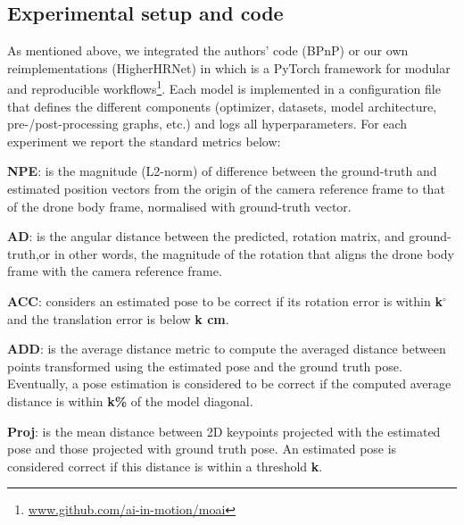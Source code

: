 
\subsection{Experimental setup and code}
As mentioned above, we integrated the authors' code (BPnP) or our own reimplementations (HigherHRNet) in \cite{moai} which is a PyTorch framework for modular and reproducible workflows\footnote{\href{https://github.com/ai-in-motion/moai}{www.github.com/ai-in-motion/moai}}.
Each model is implemented in a configuration file that defines the different components (optimizer, datasets, model architecture, pre-/post-processing graphs, etc.) and logs all hyperparameters.
For each experiment we report the standard metrics below:

\textbf{NPE}: is the magnitude (L2-norm) of difference between the ground-truth and estimated position vectors from the origin of the camera reference frame to that of the drone body frame, normalised with  ground-truth vector.

\textbf{AD}: is the angular distance between the predicted, rotation matrix, and ground-truth,or in other words, the magnitude of the rotation that aligns the drone body frame with the camera reference frame.

\textbf{ACC}: considers an estimated pose to be correct if its rotation error is within \textbf{k$^{\circ}$} and the translation error is below \textbf{k cm}.

\textbf{ADD}: is the average distance metric to compute the averaged distance between points transformed using the estimated pose and the ground truth pose. 
Eventually, a pose estimation is considered to be correct if the computed average distance is within \textbf{k\%} of the model diagonal.

\textbf{Proj}: is the mean distance between 2D keypoints projected with the estimated pose and those projected with ground truth pose. 
An estimated pose is considered correct if this distance is within a threshold \textbf{k}.


